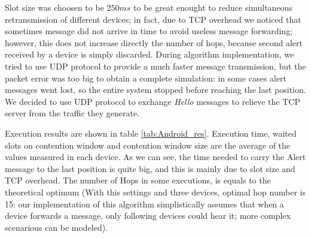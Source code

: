 Slot size was choosen to be $250ms$ to be great enought to reduce simultaneous retransmission of different devices; in fact, due to TCP overhead we noticed that sometimes message did not arrive in time to avoid useless message forwarding; however, this does not increase directly the number of hops, because second alert received by a device is simply discarded. 
During algorithm implementation, we tried to use UDP protocol to provide a much faster message transmission, but the packet error was too big to obtain a complete simulation: in some cases alert messages went lost, so the entire system stopped before reaching the last position. We decided to use UDP protocol to exchange \textit{Hello} messages to relieve the TCP server from the traffic they generate.

Execution results are shown in table \ref{tab:Android_res}. Execution time, waited slots on contention window and contention window size are the average of the values measured in each device. As we can see, the time needed to carry the Alert message to the last position is quite big, and this is mainly due to slot size and TCP overhead. The number of Hops in some executions, is equals to the theoretical optimum (With this settings and three devices, optimal hop number is 15: our implementation of this algorithm simplistically assumes that when a device forwards a message, only following devices could hear it; more complex scenarious can be modeled).

